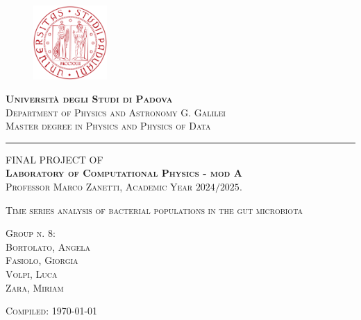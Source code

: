 
\begin{titlepage} %
	\centering %
	\begin{figure}[h]
		\centering
		\includegraphics[width=0.25\textwidth]{../Figures/frontpage/logo.png}
	\end{figure}
	\vspace*{\baselineskip} 
	{\Huge \scshape \textbf{Università degli Studi di Padova}} \\\medskip
	{\Large \scshape Department of Physics and Astronomy G. Galilei \\\smallskip
	Master degree in Physics and Physics of Data}
	\vspace{0.75\baselineskip} %
	\rule{\textwidth}{0.4pt}%
	\vspace{2\baselineskip} %

		
	{\scshape \large FINAL PROJECT OF\\ \LARGE \textbf{Laboratory of Computational Physics - mod A}\\} %
	\vspace{1\baselineskip}
	{\scshape \large Professor Marco Zanetti, Academic Year $2024/2025$.} %

	
	\vspace*{3\baselineskip} %
	

	{\scshape \LARGE Time series analysis of bacterial populations in the gut microbiota\\} %
	\vspace{2\baselineskip}

	
	{\scshape }

	{\scshape Group n. 8:\\ \vspace*{1\baselineskip}
	Bortolato, Angela \\
	Fasiolo, Giorgia \\
	Volpi, Luca \\
	Zara, Miriam }
	\vfill
	
	{\scshape\footnotesize Compiled: \today} %
\end{titlepage}
\clearpage{\pagestyle{empty}\cleardoublepage}

